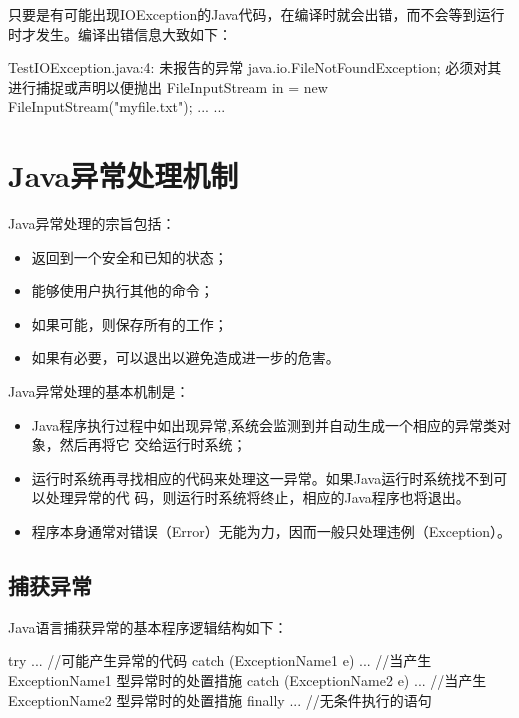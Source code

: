 
只要是有可能出现IOException的Java代码，在编译时就会出错，而不会等到运行
时才发生。编译出错信息大致如下：

\begin{stdoutCode}
TestIOException.java:4: 未报告的异常 java.io.FileNotFoundException; 
必须对其进行捕捉或声明以便抛出
    FileInputStream in = new FileInputStream("myfile.txt");
... ...
\end{stdoutCode}

\section{Java异常处理机制}

Java异常处理的宗旨包括：

\begin{itemize}
\item 返回到一个安全和已知的状态；
\item 能够使用户执行其他的命令；
\item 如果可能，则保存所有的工作；
\item 如果有必要，可以退出以避免造成进一步的危害。
\end{itemize}

Java异常处理的基本机制是：

\begin{itemize}
\item Java程序执行过程中如出现异常,系统会监测到并自动生成一个相应的异常类对象，然后再将它
  交给运行时系统；
\item 运行时系统再寻找相应的代码来处理这一异常。如果Java运行时系统找不到可以处理异常的代
  码，则运行时系统将终止，相应的Java程序也将退出。
\item 程序本身通常对错误（Error）无能为力，因而一般只处理违例（Exception）。
\end{itemize}

\subsection{捕获异常}

Java语言捕获异常的基本程序逻辑结构如下：

\begin{javaCode}
try {
  ... //可能产生异常的代码
} catch (ExceptionName1 e) {
  ... //当产生 ExceptionName1 型异常时的处置措施
} catch (ExceptionName2 e) {
  ... //当产生 ExceptionName2 型异常时的处置措施
} finally {
  ... //无条件执行的语句
}
\end{javaCode}

